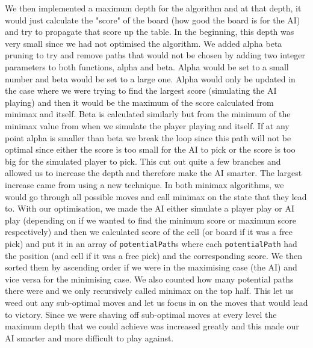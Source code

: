 \documentclass[11pt]{article}
\begin{document}
We then implemented a maximum depth for the algorithm and at that depth, it would just calculate the "score" of the board (how good the board is for the AI) and try to propagate that score up the table. In the beginning, this depth was very small since we had not optimised the algorithm. We added alpha beta pruning to try and remove paths that would not be chosen by adding two integer parameters to both functions, alpha and beta. Alpha would be set to a small number and beta would be set to a large one. Alpha would only be updated in the case where we were trying to find the largest score (simulating the AI playing) and then it would be the maximum of the score calculated from minimax and itself. Beta is calculated similarly but from the minimum of the minimax value from when we simulate the player playing and itself. If at any point alpha is smaller than beta we break the loop since this path will not be optimal since either the score is too small for the AI to pick or the score is too big for the simulated player to pick. This cut out quite a few branches and allowed us to increase the depth and therefore make the AI smarter. The largest increase came from using a new technique. In both minimax algorithms, we would go through all possible moves and call minimax on the state that they lead to. With our optimisation, we made the AI either simulate a player play or AI play (depending on if we wanted to find the minimum score or maximum score respectively) and then we calculated score of the cell (or board if it was a free pick) and put it in an array of {\tt{potentialPath}}s where each {\tt{potentialPath}} had the position (and cell if it was a free pick) and the corresponding score. We then sorted them by ascending order if we were in the maximising case (the AI) and vice versa for the minimising case. We also counted how many potential paths there were and we only recursively called minimax on the top half. This let us weed out any sub-optimal moves and let us focus in on the moves that would lead to victory. Since we were shaving off sub-optimal moves at every level the maximum depth that we could achieve was increased greatly and this made our AI smarter and more difficult to play against.
\end{document}
